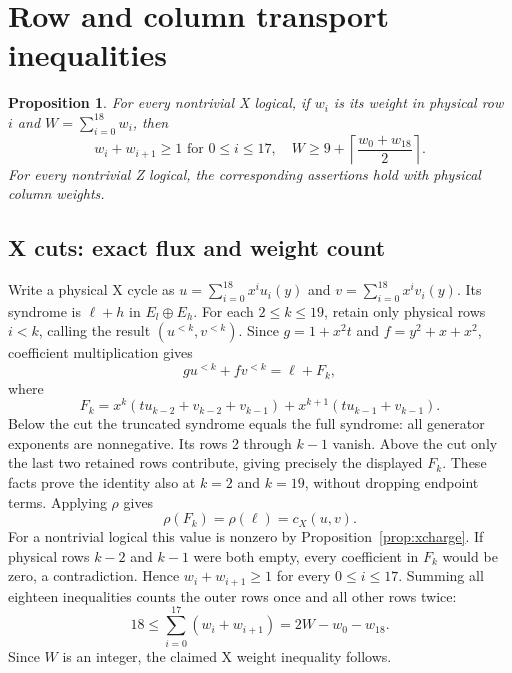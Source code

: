 \documentclass{article}
\newtheorem{proposition}{Proposition}
\begin{document}
\section{Row and column transport inequalities}\label{sec:transport}

\begin{proposition}\label{prop:transport}
  For every nontrivial X logical, if \(w_i\) is its weight in physical row \(i\) and
  \(W = \sum_{i=0}^{18} w_i\), then
  \begin{equation}
    w_i + w_{i+1} \ge 1 \text{ for } 0 \le i \le 17, \quad
    W \ge 9 + \left\lceil \frac{w_0 + w_{18}}{2} \right\rceil.
  \end{equation}
  For every nontrivial Z logical, the corresponding assertions hold with physical column weights.
\end{proposition}

\subsection{X cuts: exact flux and weight count}\label{sec:x-cuts}

Write a physical X cycle as \(u = \sum_{i=0}^{18} x^i u_i(y)\) and
\(v = \sum_{i=0}^{18} x^i v_i(y)\). Its syndrome is \(\ell + h\) in \(E_l \oplus E_h\). For each
\(2 \le k \le 19\), retain only physical rows \(i < k\), calling the result
\((u^{<k}, v^{<k})\). Since \(g = 1 + x^2 t\) and \(f = y^2 + x + x^2\), coefficient
multiplication gives
\begin{equation}
  g u^{<k} + f v^{<k} = \ell + F_k,
\end{equation}
where
\begin{equation}
  F_k = x^k (t u_{k-2} + v_{k-2} + v_{k-1}) + x^{k+1} (t u_{k-1} + v_{k-1}).
\end{equation}
Below the cut the truncated syndrome equals the full syndrome: all generator exponents are
nonnegative. Its rows 2 through \(k-1\) vanish. Above the cut only the last two retained rows
contribute, giving precisely the displayed \(F_k\). These facts prove the identity also at
\(k = 2\) and \(k = 19\), without dropping endpoint terms. Applying \(\rho\) gives
\begin{equation}
  \rho(F_k) = \rho(\ell) = c_X(u,v).
\end{equation}
For a nontrivial logical this value is nonzero by Proposition~\ref{prop:xcharge}. If physical
rows \(k-2\) and \(k-1\) were both empty, every coefficient in \(F_k\) would be zero, a
contradiction. Hence \(w_i + w_{i+1} \ge 1\) for every \(0 \le i \le 17\). Summing all eighteen
inequalities counts the outer rows once and all other rows twice:
\begin{equation}
  18 \le \sum_{i=0}^{17} (w_i + w_{i+1}) = 2W - w_0 - w_{18}.
\end{equation}
Since \(W\) is an integer, the claimed X weight inequality follows.
\end{document}
